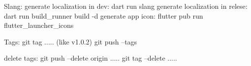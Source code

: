 Slang: 
     generate localization in dev: dart run slang
     generate localization in relese: dart run build_runner build -d
     generate app icon: flutter pub run flutter_launcher_icons

Tags: 
     git tag ..... (like v1.0.2)
     git push --tags

     delete tags:
          git push --delete origin .....
          git tag --delete .....